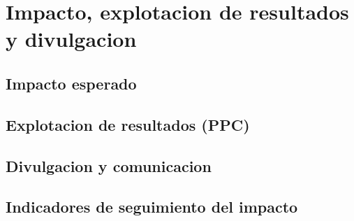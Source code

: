 \section{Impacto, explotacion de resultados y divulgacion}

\subsection{Impacto esperado}

\subsection{Explotacion de resultados (PPC)}

\subsection{Divulgacion y comunicacion}

\subsection{Indicadores de seguimiento del impacto}
